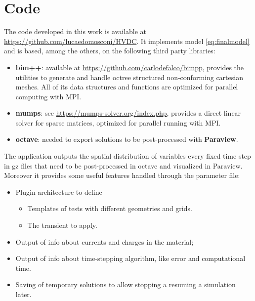 \documentclass[11pt,a4paper]{article}
\begin{document}
\section{Code}
The code developed in this work is available at \url{https://github.com/lucaedomosconi/HVDC}. It implements model \eqref{eq:finalmodel} and is based, among the others, on the following third party libraries:
\begin{itemize}
	\item \textbf{bim++}: available at \url{https://github.com/carlodefalco/bimpp}, provides the utilities to generate and handle octree structured non-conforming cartesian meshes. All of its data structures and functions are optimized for parallel computing with MPI.
	\item \textbf{mumps}: see \url{https://mumps-solver.org/index.php}, provides a direct linear solver for sparse matrices, optimized for parallel running with MPI.
	\item \textbf{octave}: needed to export solutions to be post-processed with \textbf{Paraview}.
\end{itemize}
The application outputs the spatial distribution of variables every fixed time step in gz files that need to be post-processed in octave and visualized in Paraview. Moreover it provides some useful features handled through the parameter file:
\begin{itemize}
	\item Plugin architecture to define
	\begin{itemize}
		\item Templates of tests with different geometries and grids.
		\item The transient to apply.
	\end{itemize}
	\item Output of info about currents and charges in the material;
	\item Output of info about time-stepping algorithm, like error and computational time.
	\item Saving of temporary solutions to allow stopping a resuming a simulation later.
\end{itemize}
\end{document}
